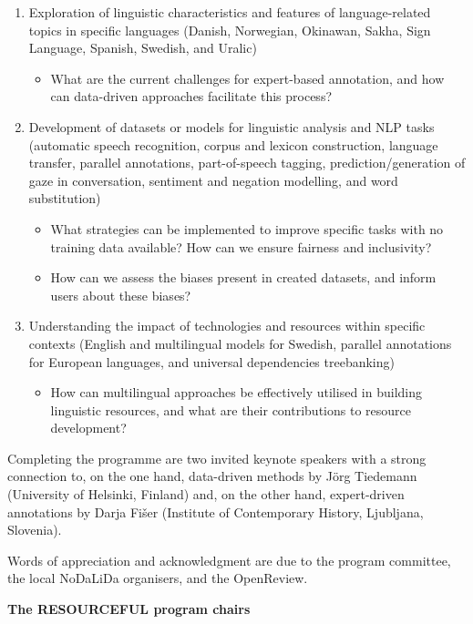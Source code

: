 \begin{enumerate}
    \item Exploration of linguistic characteristics and features of language-related topics in specific languages (Danish, Norwegian, Okinawan, Sakha, Sign Language, Spanish, Swedish, and Uralic)
    \begin{itemize}
        \item What are the current challenges for expert-based annotation, and how can data-driven approaches facilitate this process?
    \end{itemize}
    \item Development of datasets or models for linguistic analysis and NLP tasks (automatic speech recognition, corpus and lexicon construction, language transfer, parallel annotations, part-of-speech tagging, prediction/generation of gaze in conversation, sentiment and negation modelling, and word substitution)
    \begin{itemize}
        \item What strategies can be implemented to improve specific tasks with no training data available? How can we ensure fairness and inclusivity?
        \item How can we assess the biases present in created datasets, and inform users about these biases?
    \end{itemize}
    \item Understanding the impact of technologies and resources within specific contexts (English and multilingual models for Swedish, parallel annotations for European languages, and universal dependencies treebanking)
    \begin{itemize}
        \item How can multilingual approaches be effectively utilised in building linguistic resources, and what are their contributions to resource development?
    \end{itemize}    
\end{enumerate}

Completing the programme are two invited keynote speakers with a strong connection to, on the one hand, data-driven methods by Jörg Tiedemann (University of Helsinki, Finland) and, on the other hand, expert-driven annotations by Darja Fišer (Institute of Contemporary History, Ljubljana, Slovenia).
\vspace{2ex}

Words of appreciation and acknowledgment are due to the program committee, the local NoDaLiDa organisers, and the OpenReview.
\vspace{7ex}

\textbf{The RESOURCEFUL program chairs}